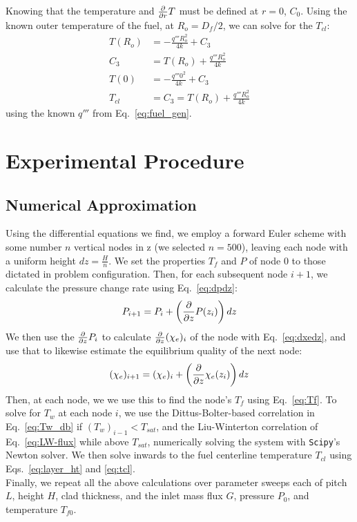 \documentclass[12pt]{article}
\begin{document}
Knowing that the temperature and $\frac{\partial}{\partial r} T$ must be defined at $r=0$, $C_0$.
Using the known outer temperature of the fuel, at $R_o=D_f/2$, we can solve for the $T_{cl}$:
\begin{align}
    T(R_o) &= -\frac{q'''R_o^2}{4k} + C_3 \\
    C_3 &= T(R_o) + \frac{q'''R_o^2}{4k} \\
    T(0) &= -\frac{q'''0^2}{4k} + C_3 \\
    \label{eq:tcl}
    T_{cl} &= C_3 = T(R_o) + \frac{q'''R_o^2}{4k}
\end{align}
using the known $q'''$ from Eq.~\ref{eq:fuel_gen}.
\section{Experimental Procedure}\label{sec:methods}
\subsection{Numerical Approximation}
Using the differential equations we find, we employ a forward Euler scheme with some number $n$ vertical nodes in z (we selected $n=500$), leaving each node with a uniform height $dz=\frac{H}{n}$.
We set the properties $T_f$ and $P$ of node $0$ to those dictated in problem configuration.
Then, for each subsequent node $i+1$, we calculate the pressure change rate using Eq.~\ref{eq:dpdz}:
\begin{equation}
    \label{eq:euler_dp}
    P_{i+1} = P_{i} + \left(\frac{\partial}{\partial z} P(z_i)\right)dz
\end{equation}
We then use the $\frac{\partial}{\partial z} P_i$ to calculate $\frac{\partial}{\partial z} (\chi_e)_i$ of the node with Eq.~\ref{eq:dxedz}, and use that to likewise estimate the equilibrium quality of the next node:
\begin{equation}
    \label{eq:euler_dxe}
    (\chi_e)_{i+1} = (\chi_e)_{i} + \left(\frac{\partial}{\partial z}\chi_e(z_i)\right)dz
\end{equation}
Then, at each node, we we use this to find the node's $T_f$ using Eq.~\ref{eq:Tf}.
To solve for $T_w$ at each node $i$, we use the Dittus-Bolter-based correlation in Eq.~\ref{eq:Tw_db} if $(T_w)_{i-1} < T_{sat}$, and the Liu-Winterton correlation of Eq.~\ref{eq:LW-flux} while above $T_{sat}$, numerically solving the system with \texttt{Scipy}'s Newton solver\cite{noauthor_newton_nodate}.
We then solve inwards to the fuel centerline temperature $T_{cl}$ using Eqs.~\ref{eq:layer_ht} and \ref{eq:tcl}.\\

Finally, we repeat all the above calculations over parameter sweeps each of pitch $L$, height $H$, clad thickness, and the inlet mass flux $G$, pressure $P_0$, and temperature $T_{f0}$.
\end{document}
